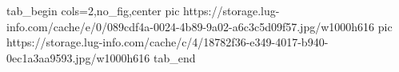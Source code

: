  
 
 
 
 


\ifcmt
  tab_begin cols=2,no_fig,center
     pic https://storage.lug-info.com/cache/e/0/089cdf4a-0024-4b89-9a02-a6c3c5d09f57.jpg/w1000h616
		 pic https://storage.lug-info.com/cache/c/4/18782f36-e349-4017-b940-0ec1a3aa9593.jpg/w1000h616
  tab_end
\fi
